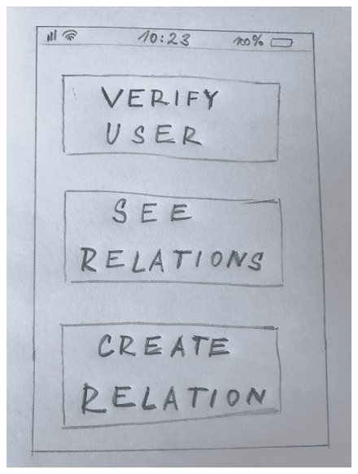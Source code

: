 \begin{figure}
\centering
\begin{minipage}{.5\textwidth}
  \centering
  \includegraphics[width=.9\linewidth]{obrazky/Navrh_uvod.png}
  \label{fig:navrh1}
\end{minipage}%
\begin{minipage}{.5\textwidth}
  \centering

\end{minipage}
\end{figure}

